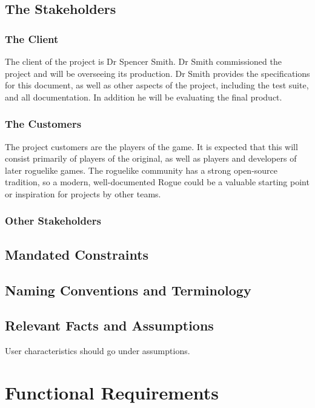 \documentclass[12pt, titlepage]{article}
\begin{document}
	\subsection{The Stakeholders}

		\subsubsection{The Client}

		The client of the project is Dr Spencer Smith. Dr Smith commissioned the project and will be overseeing its production. Dr Smith provides the specifications for this document, as well as other aspects of the project, including the test suite, and all documentation. In addition he will be evaluating the final product.

		\subsubsection{The Customers}

		The project customers are the players of the game. It is expected that this will consist primarily of players of the original, as well as players and developers of later roguelike games. The roguelike community has a strong open-source tradition, so a modern, well-documented Rogue could be a valuable starting point or inspiration for projects by other teams.

		\subsubsection{Other Stakeholders}

	\subsection{Mandated Constraints}

	\subsection{Naming Conventions and Terminology}

	\subsection{Relevant Facts and Assumptions}

	User characteristics should go under assumptions.

\section{Functional Requirements}
\end{document}
